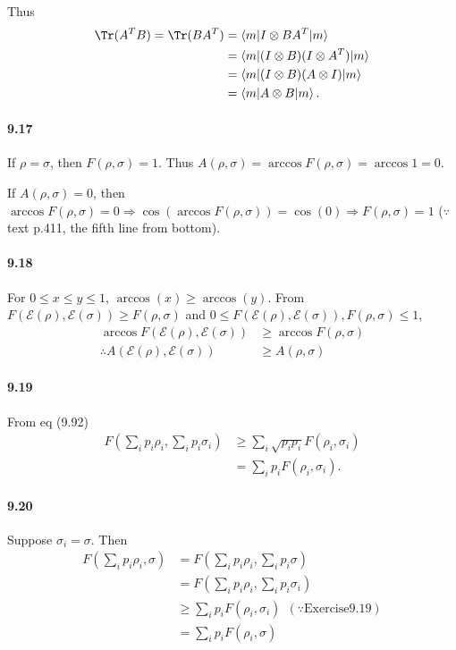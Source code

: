 Thus
\begin{align*}
    \Tr (A^T B) = \Tr(BA^T) &= \braket{m | I \otimes BA^T |m}\\
    &= \braket{m | (I \otimes B)(I \otimes A^T) |m}\\
    &= \braket{m | (I \otimes B)(A \otimes I) |m}\\ 
    &= \braket{m | A \otimes B | m}.
\end{align*}

\paragraph{9.17}
If $\rho = \sigma$, then $F(\rho, \sigma) = 1$. Thus $A(\rho, \sigma) = \arccos F(\rho, \sigma) = \arccos 1 = 0$.

If $A(\rho, \sigma) = 0$, then $\arccos F(\rho, \sigma) = 0 \Rightarrow \cos (\arccos F(\rho, \sigma)) = \cos(0) \Rightarrow F(\rho, \sigma) = 1$ ($\because$ text p.411, the fifth line from bottom).


\paragraph{9.18}
For $0 \leq x \leq y \leq 1$, $\arccos(x) \geq \arccos(y)$. From $F(\mathcal{E}(\rho), \mathcal{E}(\sigma)) \geq F(\rho, \sigma)$ and $0 \leq F(\mathcal{E}(\rho), \mathcal{E}(\sigma)), F(\rho, \sigma) \leq 1$,
\begin{align*}
    \arccos F(\mathcal{E}(\rho), \mathcal{E}(\sigma)) &\geq \arccos F(\rho, \sigma)\\
    \therefore A (\mathcal{E}(\rho), \mathcal{E}(\sigma)) &\geq A(\rho, \sigma)
\end{align*}



\paragraph{9.19}
From eq (9.92)
\begin{align*}
    F \left( \sum_i p_i \rho_i, \sum_i p_i \sigma_i \right) &\geq \sum_i \sqrt{p_i p_i} F(\rho_i, \sigma_i)\\
        &= \sum_i p_i F(\rho_i, \sigma_i).
\end{align*}


\paragraph{9.20}
Suppose $\sigma_i = \sigma$. Then
\begin{align*}
    F \left( \sum_i p_i \rho_i, \sigma \right) &= F \left( \sum_i p_i \rho_i, \sum_i p_i \sigma \right) \\
        &= F \left( \sum_i p_i \rho_i, \sum_i p_i \sigma_i \right) \\
        &\geq \sum_i p_i F(\rho_i, \sigma_i)~~(\because \text{Exercise}  9.19)\\
        &= \sum_i p_i F(\rho_i, \sigma)
\end{align*}


